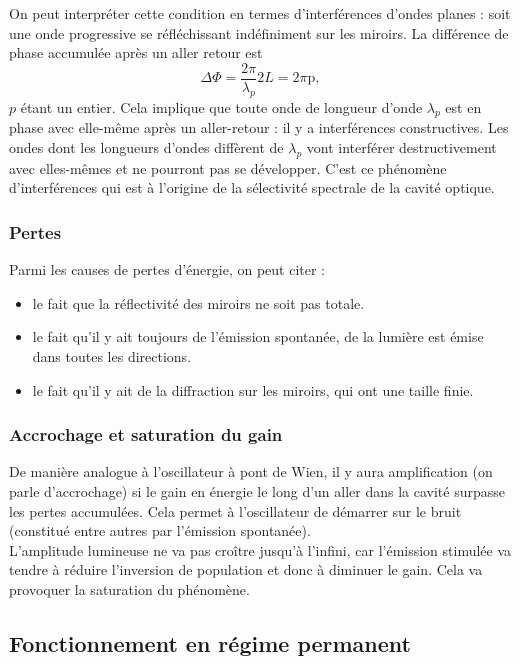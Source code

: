 \documentclass[11pt,a4paper]{report}
\begin{document}
On peut interpréter cette condition en termes d'interférences d'ondes planes : soit une onde progressive se réfléchissant indéfiniment sur les miroirs. La différence de phase accumulée après un aller retour est
\begin{equation}
	\Delta\Phi = \frac{2\pi}{\lambda_p}2L = 2\pi \text{p},
\end{equation}
$p$ étant un entier. Cela implique que toute onde de longueur d'onde $\lambda_p$ est en phase avec elle-même après un aller-retour : il y a interférences constructives. Les ondes dont les longueurs d'ondes diffèrent de $\lambda_p$ vont interférer destructivement avec elles-mêmes et ne pourront pas se développer. C'est ce phénomène d'interférences qui est à l'origine de la sélectivité spectrale de la cavité optique.

\subsubsection{Pertes}

Parmi les causes de pertes d'énergie, on peut citer :
\begin{itemize}
	\item le fait que la réflectivité des miroirs ne soit pas totale.
	\item le fait qu'il y ait toujours de l'émission spontanée, de la lumière est émise dans toutes les 			directions.
	\item le fait qu'il y ait de la diffraction sur les miroirs, qui ont une taille finie.
\end{itemize}

\subsubsection{Accrochage et saturation du gain}

De manière analogue à l'oscillateur à pont de Wien, il y aura amplification (on parle d'accrochage) si le gain en énergie le long d'un aller dans la cavité surpasse les pertes accumulées. Cela permet à l'oscillateur de démarrer sur le bruit (constitué entre autres par l'émission spontanée).\\

L'amplitude lumineuse ne va pas croître jusqu'à l'infini, car l'émission stimulée va tendre à réduire l'inversion de population et donc à diminuer le gain. Cela va provoquer la saturation du phénomène.

\subsection{Fonctionnement en régime permanent}
\end{document}
